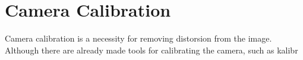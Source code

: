 \chapter{Camera Calibration}
Camera calibration is a necessity for removing distorsion from the image. Although there are already made tools for calibrating the camera, such as kalibr \cite{kalibr}
